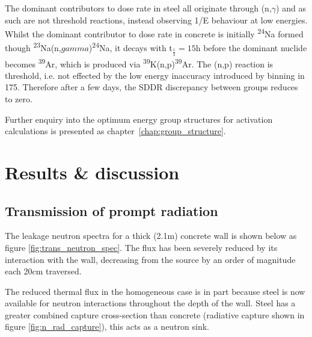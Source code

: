 The dominant contributors to dose rate in steel all originate through (n,$\gamma$) and as such are not threshold reactions, instead observing 1/E behaviour at low energies. Whilst the dominant contributor to dose rate in concrete is initially \textsuperscript{24}Na formed though \textsuperscript{23}Na(n,$gamma$)\textsuperscript{24}Na, it decays with t$_{\frac{1}{2}}=15$h before the dominant nuclide becomes \textsuperscript{39}Ar, which is produced via \textsuperscript{39}K(n,p)\textsuperscript{39}Ar. The (n,p) reaction is threshold, i.e. not effected by the low energy inaccuracy introduced by binning in 175. Therefore after a few days, the SDDR discrepancy between groups reduces to zero.

Further enquiry into the optimum energy group structures for activation calculations is presented as chapter~\ref{chap:group_structure}.

\section{Results \& discussion}

\subsection{Transmission of prompt radiation}
\label{subsec:prompt}
The leakage neutron spectra for a thick (2.1m) concrete wall is shown below as figure \ref{fig:trans_neutron_spec}. The flux has been severely reduced by its interaction with the wall, decreasing from the source by an order of magnitude each 20cm traversed.\par
The reduced thermal flux in the homogeneous case is in part because steel is now available for neutron interactions throughout the depth of the wall. Steel has a greater combined capture cross-section than concrete (radiative capture shown in figure \ref{fig:n_rad_capture}), this acts as a neutron sink. 

